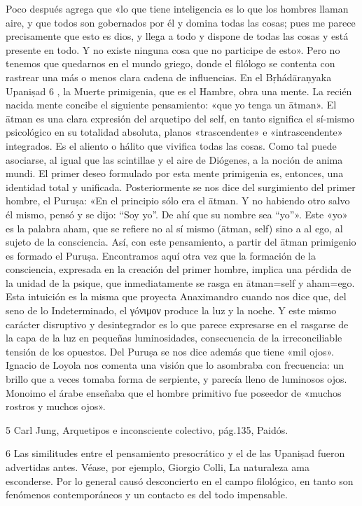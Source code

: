 \documentclass[a4paper]{article}
\begin{document}
Poco después agrega que «lo que tiene inteligencia es lo que los hombres llaman
aire, y que todos son gobernados por él y domina todas las cosas; pues me parece
precisamente que esto es dios, y llega a todo y dispone de todas las cosas y
está presente en todo. Y no existe ninguna cosa que no participe de esto». Pero
no tenemos que quedarnos en el mundo griego, donde el filólogo se contenta con
rastrear una más o menos clara cadena de influencias. En el Bṛhádāraṇyaka
Upaniṣad 6 , la Muerte primigenia, que es el Hambre, obra una mente. La recién
nacida mente concibe el siguiente pensamiento: «que yo tenga un ātman». El ātman
es una clara expresión del arquetipo del self, en tanto significa el sí-mismo
psicológico en su totalidad absoluta, planos «trascendente» e «intrascendente»
integrados. Es el aliento o hálito que vivifica todas las cosas. Como tal puede
asociarse, al igual que las scintillae y el aire de Diógenes, a la noción de
anima mundi. El primer deseo formulado por esta mente primigenia es, entonces,
una identidad total y unificada. Posteriormente se nos dice del surgimiento del
primer hombre, el Puruṣa: «En el principio sólo era el ātman. Y no habiendo otro
salvo él mismo, pensó y se dijo: “Soy yo”. De ahí que su nombre sea “yo”». Este
«yo» es la palabra aham, que se refiere no al sí mismo (ātman, self) sino a al
ego, al sujeto de la consciencia. Así, con este pensamiento, a partir del ātman
primigenio es formado el Puruṣa. Encontramos aquí otra vez que la formación de
la consciencia, expresada en la creación del primer hombre, implica una pérdida
de la unidad de la psique, que inmediatamente se rasga en ātman=self y aham=ego.
Esta intuición es la misma que proyecta Anaximandro cuando nos dice que, del
seno de lo Indeterminado, el γóνιμον produce la luz y la noche. Y este mismo
carácter disruptivo y desintegrador es lo que parece expresarse en el rasgarse
de la capa de la luz en pequeñas luminosidades, consecuencia de la
irreconciliable tensión de los opuestos. Del Puruṣa se nos dice además que tiene
«mil ojos». Ignacio de Loyola nos comenta una visión que lo asombraba con
frecuencia: un brillo que a veces tomaba forma de serpiente, y parecía lleno de
luminosos ojos. Monoimo el árabe enseñaba que el hombre primitivo fue poseedor
de «muchos rostros y muchos ojos».

5 Carl Jung, Arquetipos e inconsciente colectivo, pág.135, Paidós.

6 Las similitudes entre el pensamiento presocrático y el de las Upaniṣad fueron
advertidas antes. Véase, por ejemplo, Giorgio Colli, La naturaleza ama
esconderse. Por lo general causó desconcierto en el campo filológico, en tanto
son fenómenos contemporáneos y un contacto es del todo impensable.
\end{document}
